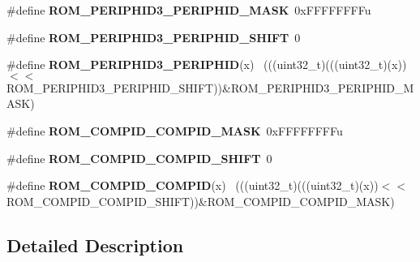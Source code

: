 \begin{DoxyCompactItemize}
\item 
\hypertarget{group___r_o_m___register___masks_ga0f7212db2daf16bb9cd76004eef1f845}{}\#define {\bfseries R\+O\+M\+\_\+\+P\+E\+R\+I\+P\+H\+I\+D3\+\_\+\+P\+E\+R\+I\+P\+H\+I\+D\+\_\+\+M\+A\+S\+K}~0x\+F\+F\+F\+F\+F\+F\+F\+Fu\label{group___r_o_m___register___masks_ga0f7212db2daf16bb9cd76004eef1f845}

\item 
\hypertarget{group___r_o_m___register___masks_ga61106adc7eb36f078c312d6111da5941}{}\#define {\bfseries R\+O\+M\+\_\+\+P\+E\+R\+I\+P\+H\+I\+D3\+\_\+\+P\+E\+R\+I\+P\+H\+I\+D\+\_\+\+S\+H\+I\+F\+T}~0\label{group___r_o_m___register___masks_ga61106adc7eb36f078c312d6111da5941}

\item 
\hypertarget{group___r_o_m___register___masks_gace37d13cebd28e03bb413cedb5992f90}{}\#define {\bfseries R\+O\+M\+\_\+\+P\+E\+R\+I\+P\+H\+I\+D3\+\_\+\+P\+E\+R\+I\+P\+H\+I\+D}(x)                            ~(((uint32\+\_\+t)(((uint32\+\_\+t)(x))$<$$<$R\+O\+M\+\_\+\+P\+E\+R\+I\+P\+H\+I\+D3\+\_\+\+P\+E\+R\+I\+P\+H\+I\+D\+\_\+\+S\+H\+I\+F\+T))\&R\+O\+M\+\_\+\+P\+E\+R\+I\+P\+H\+I\+D3\+\_\+\+P\+E\+R\+I\+P\+H\+I\+D\+\_\+\+M\+A\+S\+K)\label{group___r_o_m___register___masks_gace37d13cebd28e03bb413cedb5992f90}

\item 
\hypertarget{group___r_o_m___register___masks_gae20c6541595b7ae93be71b45403230b7}{}\#define {\bfseries R\+O\+M\+\_\+\+C\+O\+M\+P\+I\+D\+\_\+\+C\+O\+M\+P\+I\+D\+\_\+\+M\+A\+S\+K}~0x\+F\+F\+F\+F\+F\+F\+F\+Fu\label{group___r_o_m___register___masks_gae20c6541595b7ae93be71b45403230b7}

\item 
\hypertarget{group___r_o_m___register___masks_ga348650897eca9cb7d75adcf78efceb33}{}\#define {\bfseries R\+O\+M\+\_\+\+C\+O\+M\+P\+I\+D\+\_\+\+C\+O\+M\+P\+I\+D\+\_\+\+S\+H\+I\+F\+T}~0\label{group___r_o_m___register___masks_ga348650897eca9cb7d75adcf78efceb33}

\item 
\hypertarget{group___r_o_m___register___masks_ga9a8a33586badaef729481104bbedabe4}{}\#define {\bfseries R\+O\+M\+\_\+\+C\+O\+M\+P\+I\+D\+\_\+\+C\+O\+M\+P\+I\+D}(x)                                      ~(((uint32\+\_\+t)(((uint32\+\_\+t)(x))$<$$<$R\+O\+M\+\_\+\+C\+O\+M\+P\+I\+D\+\_\+\+C\+O\+M\+P\+I\+D\+\_\+\+S\+H\+I\+F\+T))\&R\+O\+M\+\_\+\+C\+O\+M\+P\+I\+D\+\_\+\+C\+O\+M\+P\+I\+D\+\_\+\+M\+A\+S\+K)\label{group___r_o_m___register___masks_ga9a8a33586badaef729481104bbedabe4}

\end{DoxyCompactItemize}


\subsection{Detailed Description}
